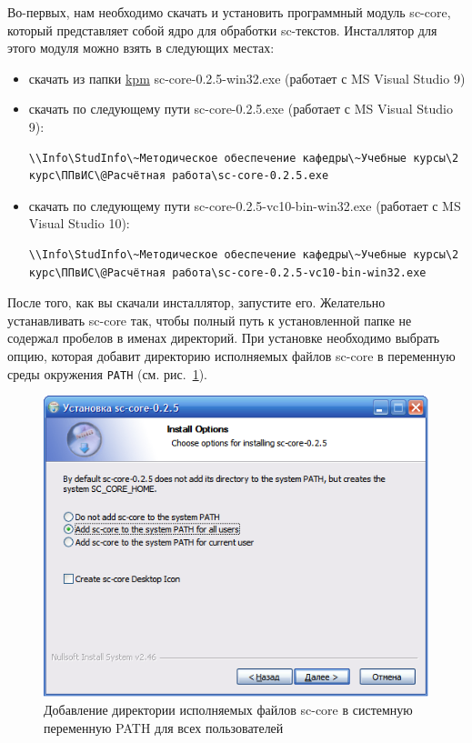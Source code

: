 Во-первых, нам необходимо скачать и установить программный модуль
sc-core, который представляет собой ядро для обработки
sc-текстов. Инсталлятор для этого модуля можно взять в следующих
местах:

\begin{itemize}
\item скачать из папки
  \href{http://sourceforge.net/projects/ostis/files/kpm/}{kpm}
  sc-core-0.2.5-win32.exe (работает с MS Visual Studio 9)
\item скачать по следующему пути sc-core-0.2.5.exe (работает с MS
  Visual Studio 9):
\begin{verbatim}
\\Info\StudInfo\~Методическое обеспечение кафедры\~Учебные курсы\2 курс\ППвИС\@Расчётная работа\sc-core-0.2.5.exe
\end{verbatim}
\item скачать по следующему пути sc-core-0.2.5-vc10-bin-win32.exe
  (работает с MS Visual Studio 10):
\begin{verbatim}
\\Info\StudInfo\~Методическое обеспечение кафедры\~Учебные курсы\2 курс\ППвИС\@Расчётная работа\sc-core-0.2.5-vc10-bin-win32.exe
\end{verbatim}
\end{itemize}

После того, как вы скачали инсталлятор, запустите его. Желательно
устанавливать sc-core так, чтобы полный путь к установленной папке не
содержал пробелов в именах директорий. При установке необходимо
выбрать опцию, которая добавит директорию исполняемых файлов sc-core в
переменную среды окружения \verb+PATH+ (см. рис.~\ref{fig:Add_sc_core_to_path}).

\begin{figure}[h]
  \centering
  \includegraphics[scale=0.7]{images/4/setup/Add_sc_core_to_path}
  \caption{Добавление директории исполняемых файлов sc-core в
    системную переменную PATH для всех пользователей}
  \label{fig:Add_sc_core_to_path}
\end{figure}
 
